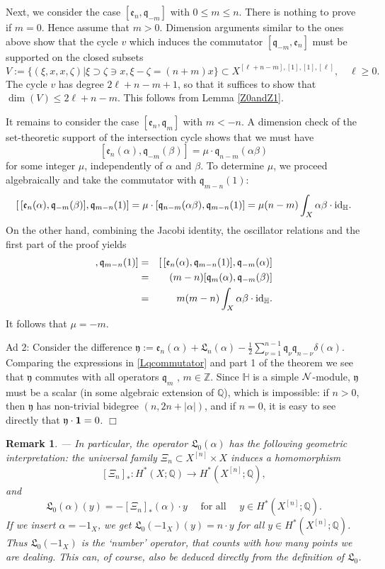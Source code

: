 \documentclass[twoside,11pt]{article}
\newtheorem{remark}[theorem]{Remark}
\newcommand{\qed}{\hspace*{\fill}$\Box$\vspace{2ex}}
\newcommand{\kn}{{\cal N}}
\newcommand{\IH}{{\mathbb H}}
\newcommand{\IQ}{{\mathbb Q}}
\newcommand{\IZ}{{\mathbb Z}}
\newcommand{\gothe}{{\mathfrak e}}
\newcommand{\gothq}{{\mathfrak q}}
\newcommand{\gothy}{{\mathfrak y}}
\newcommand{\gothL}{{\mathfrak L}}
\newcommand{\ee}{\gothe}
\newcommand{\qq}{\gothq}
\newcommand{\LL}{\gothL}
\newcommand{\vacuum}{{\bf 1}}
\newcommand{\id}{{\rm id}}
\newcommand{\lra}{\longrightarrow}
\begin{document}
Next, we consider the case $[\ee_n,\qq_{-m}]$ with $0\leq m\leq n$. There is
nothing to prove if $m=0$. Hence assume that $m>0$. Dimension arguments similar
to the ones above show that the cycle $v$ which induces the commutator 
$[\qq_{-m},\ee_n]$ must be supported on the closed subsets
$$V:=\{(\xi,x,x,\zeta)|\xi\supset\zeta\ni x, \xi-\zeta=(n+m)x\}\subset
X^{[\ell+n-m],[1],[1],[\ell]},\quad\ell\geq0.$$
The cycle $v$ has degree $2\ell+n-m+1$, so that it suffices to show that
$\dim(V)\leq 2\ell+n-m$. This follows from Lemma \ref{Z0andZ1}.


It remains to consider the case $[\ee_n,\qq_m]$ with $m<-n$. A dimension check
of the set-theoretic support of the intersection cycle shows that we must
have
$$[\ee_n(\alpha),\qq_{-m}(\beta)]=\mu\cdot\qq_{n-m}(\alpha\beta)$$
for some integer $\mu$, independently of $\alpha$ and $\beta$. 
To determine $\mu$, we proceed algebraically and take the commutator with $\qq_{m-n}(1)$:
$$
[\,[\ee_n(\alpha),\qq_{-m}(\beta)],\qq_{m-n}(1)]=
\mu\cdot[\qq_{n-m}(\alpha\beta),\qq_{m-n}(1)]=
\mu(n-m)\int_X\alpha\beta\cdot\id_\IH.
$$
On the other hand, combining the Jacobi identity, the oscillator relations and 
the first part of the proof yields
\begin{eqnarray*}
[\,[\ee_n(\alpha),\qq_{-m}(\beta)],\qq_{m-n}(1)]&=&
[\,[\ee_n(\alpha),\qq_{m-n}(1)],\qq_{-m}(\alpha)]\\
&=&(m-n)[\qq_m(\alpha),\qq_{-m}(\beta)]\\
&=&m(m-n)\int_X\alpha\beta\cdot\id_{\IH}.
\end{eqnarray*}
It follows that $\mu=-m$.
\medskip


Ad 2:
Consider the difference 
$\gothy:=\ee_n(\alpha)+\LL_n(\alpha)-\frac{1}{2}\sum_{\nu=1}^{n-1}\qq_\nu\qq_{n-\nu}\delta(\alpha)$.
Comparing the expressions in \ref{Lqcommutator} and part 1 of the theorem
we see that $\gothy$ commutes with all operators $\qq_m$ , $m\in\IZ$. 
Since $\IH$ is a simple $\kn$-module, $\gothy$ must be a scalar (in some
algebraic extension of $\IQ$), which is impossible: if $n>0$, then $\gothy$ has non-trivial bidegree $(n,2n+|\alpha|)$, and if $n=0$, it is easy to see 
directly that $\gothy\cdot\vacuum=0$.
\qed
 
\begin{remark}--- In particular, the operator $\LL_0(\alpha)$ has the
following geometric interpretation: the universal family $\Xi_n\subset
X^{[n]}\times X$ induces a homomorphism
$$[\Xi_n]_*:H^*(X;\IQ)\lra H^*(X^{[n]};\IQ),$$
and
$$\LL_0(\alpha)(y)=-[\Xi_n]_*(\alpha)\cdot y \quad\mbox{ for all }\quad
y\in H^*(X^{[n]};\IQ).$$
If we insert $\alpha=-1_X$, we get $\LL_0(-1_X)(y)=n\cdot y$ for all $y\in H^*(X^{[n]};\IQ)$.
Thus $\LL_0(-1_X)$ is the `number' operator, that counts with how many points
we are dealing. This can, of course, also be deduced directly from the 
definition of $\LL_0$.
\end{remark} 
\end{document}
